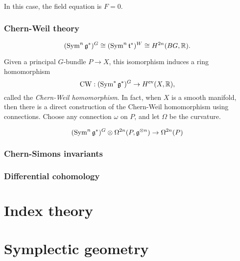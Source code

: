 \documentclass{../../large}
\begin{document}
In this case, the field equation is $F=0$.

\section{Chern-Weil theory}


\[(\operatorname{Sym}^n\mathfrak{g}^*)^G\cong(\operatorname{Sym}^n\mathfrak{t}^*)^W\cong H^{2n}(BG,\mathbb{R}).\]

Given a principal $G$-bundle $P\to X$, this isomorphism induces a ring homomorphism
\[\mathrm{CW}:(\operatorname{Sym}^*\mathfrak{g}^*)^G\to H^{\mathrm{ev}}(X,\mathbb{R}),\]
called the \emph{Chern-Weil homomorphism}.
In fact, when $X$ is a smooth manifold, then there is a direct construction of the Chern-Weil homomorphism using connections.
Choose any connection $\omega$ on $P$, and let $\Omega$ be the curvature.



\[(\operatorname{Sym}^n\mathfrak{g}^*)^G\otimes\Omega^{2n}(P,\mathfrak{g}^{\otimes n})\to\Omega^{2n}(P)\]

\section{Chern-Simons invariants}


\section{Differential cohomology}

\chapter{}
\chapter{}




\part{Index theory}
\chapter{}
\chapter{}
\chapter{}


\part{Symplectic geometry}
\chapter{}
\chapter{}
\chapter{}
\end{document}
